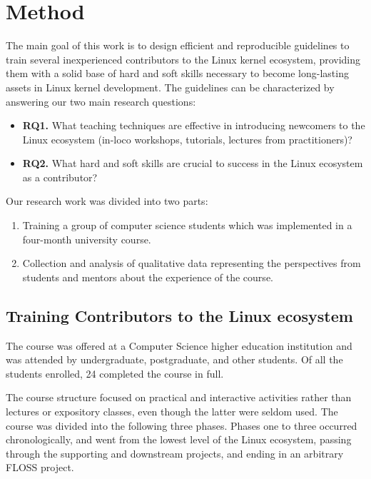 \section{Method}
\label{sec:method}

The main goal of this work is to design efficient and reproducible guidelines to
train several inexperienced contributors to the Linux kernel ecosystem,
providing them with a solid base of hard and soft skills necessary to become
long-lasting assets in Linux kernel development. The guidelines can be
characterized by answering our two main research questions:

\begin{itemize}
    \item \textbf{RQ1.} What teaching techniques are effective in introducing
    newcomers to the Linux ecosystem (in-loco workshops, tutorials, lectures
    from practitioners)?
    \item \textbf{RQ2.} What hard and soft skills are crucial to success in the
    Linux ecosystem as a contributor?
\end{itemize}

Our research work was divided into two parts:

\begin{enumerate}
    \item Training a group of computer science students which was implemented in
    a four-month university course.
    \item Collection and analysis of qualitative data representing the
    perspectives from students and mentors about the experience of the course.
\end{enumerate}

\subsection{Training Contributors to the Linux ecosystem}

The course was offered at a Computer Science higher education institution and
was attended by undergraduate, postgraduate, and other students. Of all the
students enrolled, 24 completed the course in full.

The course structure focused on practical and interactive activities rather than
lectures or expository classes, even though the latter were seldom used. The
course was divided into the following three phases. Phases one to three occurred
chronologically, and went from the lowest level of the Linux ecosystem, passing
through the supporting and downstream projects, and ending in an arbitrary FLOSS
project.

